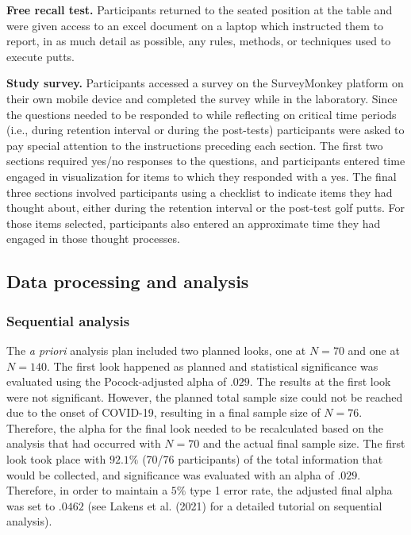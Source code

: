\documentclass[
  english,
  man,floatsintext]{apa7}
\begin{document}
\textbf{Free recall test.} Participants returned to the seated position at the table and were given access to an excel document on a laptop which instructed them to report, in as much detail as possible, any rules, methods, or techniques used to execute putts.

\textbf{Study survey.} Participants accessed a survey on the SurveyMonkey platform on their own mobile device and completed the survey while in the laboratory. Since the questions needed to be responded to while reflecting on critical time periods (i.e., during retention interval or during the post-tests) participants were asked to pay special attention to the instructions preceding each section. The first two sections required yes/no responses to the questions, and participants entered time engaged in visualization for items to which they responded with a yes. The final three sections involved participants using a checklist to indicate items they had thought about, either during the retention interval or the post-test golf putts. For those items selected, participants also entered an approximate time they had engaged in those thought processes.

\hypertarget{data-processing-and-analysis}{%
\subsection{Data processing and analysis}\label{data-processing-and-analysis}}

\hypertarget{sequential-analysis}{%
\subsubsection{Sequential analysis}\label{sequential-analysis}}

The \emph{a priori} analysis plan included two planned looks, one at \(N = 70\) and one at \(N =140\). The first look happened as planned and statistical significance was evaluated using the Pocock-adjusted alpha of \(.029\). The results at the first look were not significant. However, the planned total sample size could not be reached due to the onset of COVID-19, resulting in a final sample size of \(N = 76\). Therefore, the alpha for the final look needed to be recalculated based on the analysis that had occurred with \(N = 70\) and the actual final sample size. The first look took place with \(92.1\%\) (70/76 participants) of the total information that would be collected, and significance was evaluated with an alpha of \(.029\). Therefore, in order to maintain a \(5\%\) type 1 error rate, the adjusted final alpha was set to \(.0462\) (see Lakens et al. (2021) for a detailed tutorial on sequential analysis).
\end{document}
